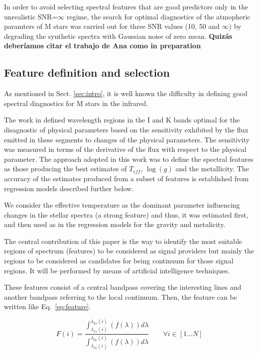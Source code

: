 {{{ In order to avoid selecting spectral features that are good
  predictors only in the unrealistic SNR=$\infty$ regime, the search
  for optimal diagnostics of the atmopheric paramters of M stars was
  carried out for three SNR values (10, 50 and $\infty$) by degrading
  the synthetic spectra with Gaussian noise of zero mean.  {\bf Quizás
  deberíamos citar el trabajo de Ana como in preparation} }

\subsection{Feature definition and selection}
\label{subsec:FD}
{ As mentioned in Sect. \ref{sec:intro}, it is well known the
difficulty in defining good spectral diagnostics for M stars in the
infrared.}

{The work in \cite{2013A&A...549A.129C} defined wavelength regions in
the I and K bands optimal for the disagnostic of physical parameters
based on the sensitivity exhibited by the flux emitted in these
segments to changes of the physical parameters. The sensitivity was
measured in terms of the derivative of the flux with respect to the
physical parameter. The approach adopted in this work was to define
the spectral features as those producing the best estimates of
$T_{eff}$, $\log(g)$ and the metallicity. The accuracy of the
estimates produced from a subset of features is established from
regression models described further below.

We consider the effective temperature as the dominant parameter
influencing changes in the stellar spectra (a strong feature) and
thus, it was estimated first, and then used as  in the regression models for the
gravity and metalicity.

The central contribution of this paper is the way to identify the most suitable
regions of spectrum (features) to be considered as signal providers 
but mainly the regions to be considered 
as candidates for being continuum for those signal regions.
It will be performed by means of artificial intelligence techniques.

These features consist of
a central bandpass covering the interesting lines and another bandpass
referring to the local continuum. Then, the feature can be written like 
Eq.~\eqref{eq:feature}.

\begin{equation}\label{eq:feature}
  F(i) =  \frac{ \int_{\lambda_{1s}(i)}^{\lambda_{2s}(i)} \left(f(\lambda)\right) d{\lambda}}
               { \int_{\lambda_{1c}(i)}^{\lambda_{2c}(i)} \left(f(\lambda)\right) d{\lambda}} 
               \quad \quad \forall i \in [1 \ldots N]
\end{equation}


}}}
